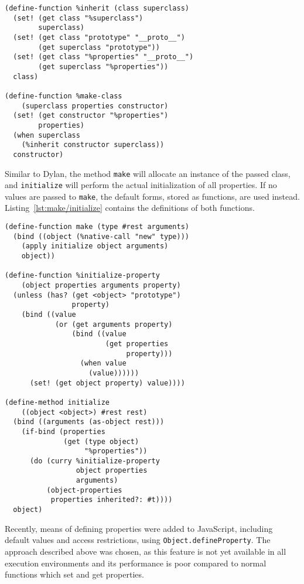 \documentclass{acm_proc_article-sp}
\begin{document}
\begin{lstlisting}[label=lst:make-class/inherit,
    caption=Definitions of \texttt{\%make-class} and \texttt{\%inherit}
]
(define-function %inherit (class superclass)
  (set! (get class "%superclass")
        superclass)
  (set! (get class "prototype" "__proto__")
        (get superclass "prototype"))
  (set! (get class "%properties" "__proto__")
        (get superclass "%properties"))
  class)

(define-function %make-class
    (superclass properties constructor)
  (set! (get constructor "%properties")
        properties)
  (when superclass
    (%inherit constructor superclass))
  constructor)
\end{lstlisting}

Similar to Dylan, the method \texttt{make} will allocate an instance of
the passed class, and \texttt{initialize} will perform the actual
initialization of all properties. If no values are passed to
\texttt{make}, the default forms, stored as functions, are used
instead. Listing~\ref{lst:make/initialize} contains the definitions of
both functions.

\begin{lstlisting}[label=lst:make/initialize,
    caption=Definitions of \texttt{make} and \texttt{initialize}
]
(define-function make (type #rest arguments)
  (bind ((object (%native-call "new" type)))
    (apply initialize object arguments)
    object))

(define-function %initialize-property
    (object properties arguments property)
  (unless (has? (get <object> "prototype")
                property)
    (bind ((value
            (or (get arguments property)
                (bind ((value
                        (get properties
                             property)))
                  (when value
                    (value))))))
      (set! (get object property) value))))

(define-method initialize
    ((object <object>) #rest rest)
  (bind ((arguments (as-object rest)))
    (if-bind (properties
              (get (type object)
                   "%properties"))
      (do (curry %initialize-property
                 object properties
                 arguments)
          (object-properties
           properties inherited?: #t))))
  object)
\end{lstlisting}

Recently, means of defining properties were added to JavaScript,
including default values and access restrictions, using
\sloppy\mbox{\texttt{Object.defineProperty}}. The approach described
above was chosen, as this feature is not yet available in all
execution environments and its performance is poor compared to normal
functions which set and get properties.
\end{document}
